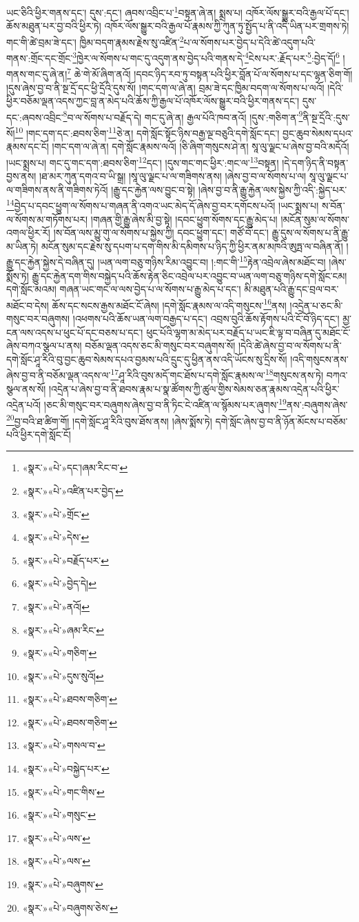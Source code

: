 ཡང་ཅིའི་ཕྱིར་གནས་དང་། དུས་:དང་། ཞབས་འབྲིང་པ་\footnote{«སྣར་»«པེ་»དང་།ཞམ་རིང་བ་}བསྟན་ཞེ་ན། སྨྲས་པ། འཁོར་ལོས་སྒྱུར་བའི་རྒྱལ་པོ་དང་། ཆོས་མཐུན་པར་བྱ་བའི་ཕྱིར་ཏེ། འཁོར་ལོས་སྒྱུར་བའི་རྒྱལ་པོ་རྣམས་ཀྱི་ཀུན་ཏུ་སྤྱོད་པ་ནི་འདི་ཡིན་པར་གྲགས་ཏེ། གང་གི་ཚེ་བྲམ་ཟེ་དང་། ཁྱིམ་བདག་རྣམས་རྗེས་སུ་འཛིན་\footnote{«སྣར་»«པེ་»འཛིན་པར་བྱེད་}པ་ལ་སོགས་པར་བྱེད་པ་དེའི་ཚེ་འདུག་པའི་གནས་:གྲོང་དང་གྲོང་\footnote{«སྣར་»«པེ་»གྲོང་}ཁྱེར་ལ་སོགས་པ་གང་དུ་འདུག་ནས་བྱེད་པའི་གནས་དེ་\footnote{«སྣར་»«པེ་»དེས་}ངེས་པར་:རྗོད་པར་\footnote{«སྣར་»«པེ་»བརྗོད་པར་}:བྱེད་དོ།\footnote{«སྣར་»«པེ་»བྱེད་དེ།} །གནས་གང་དུ་ཞེ་ན།\footnote{«སྣར་»«པེ་»ནའོ།} ཆེ་གེ་མོ་ཞིག་ནའོ། །དབང་ཉིད་རབ་ཏུ་བསྟན་པའི་ཕྱིར་བློན་པོ་ལ་སོགས་པ་དང་ལྷན་ཅིག་གོ། །དུས་ཞེས་བྱ་བ་ནི་སྔ་དྲོ་དང་ཕྱི་དྲོའི་དུས་སོ། །གང་དག་ལ་ཞེ་ན། བྲམ་ཟེ་དང་ཁྱིམ་བདག་ལ་སོགས་པ་ལའོ། །དེའི་ཕྱིར་བཅོམ་ལྡན་འདས་ཀྱང་བླ་ན་མེད་པའི་ཆོས་ཀྱི་རྒྱལ་པོ་འཁོར་ལོས་སྒྱུར་བའི་ཕྱིར་གནས་དང་། དུས་དང་:ཞབས་འབྲིང་\footnote{«སྣར་»«པེ་»ཞམ་རིང་}བ་ལ་སོགས་པ་བརྗོད་དེ། གང་དུ་ཞེ་ན། རྒྱལ་པོའི་ཁབ་ནའོ། །དུས་:གཅིག་ན་\footnote{«སྣར་»«པེ་»གཅིག་}ནི་སྔ་དྲོའི་:དུས་སོ།\footnote{«སྣར་»«པེ་»དུས་སུའོ།} །གང་དག་དང་:ཐབས་ཅིག་\footnote{«སྣར་»«པེ་»ཐབས་གཅིག་}ཅེ་ན། དགེ་སློང་སྟོང་ཉིས་བརྒྱ་ལྔ་བཅུའི་དགེ་སློང་དང་། བྱང་ཆུབ་སེམས་དཔའ་རྣམས་དང་ངོ། །གང་དག་ལ་ཞེ་ན། དགེ་སློང་རྣམས་ལའོ། །ཅི་ཞིག་གསུངས་ཤེ་ན། སཱ་ལུ་ལྗང་པ་ཞེས་བྱ་བའི་མདོའོ། །ཡང་སྨྲས་པ། གང་དུ་གང་དག་:ཐབས་ཅིག་\footnote{«སྣར་»«པེ་»ཐབས་གཅིག་}དང་། །དུས་གང་གང་ཕྱིར་:གང་ལ་\footnote{«སྣར་»«པེ་»གསལ་བ་}བསྟན། །དེ་དག་ཉིད་ནི་བསྟན་བྱས་ནས། །ཐ་མར་ཀུན་དགའ་བ་ཡི་སྒྲ། །སཱ་ལུ་ལྗང་པ་ལ་གཟིགས་ནས། །ཞེས་བྱ་བ་ལ་སོགས་པ་ལ། སཱ་ལུ་ལྗང་པ་ལ་གཟིགས་ནས་ནི་གཟིགས་ཏེའོ། །རྒྱུ་དང་རྐྱེན་ལས་བྱུང་བ་སྟེ། །ཞེས་བྱ་བ་ནི་རྒྱུ་རྐྱེན་ལས་སྐྱེས་ཀྱི་འདི་:སྐྱེད་པར་\footnote{«སྣར་»«པེ་»བསྐྱེད་པར་}བྱེད་པ་དབང་ཕྱུག་ལ་སོགས་པ་གཞན་ནི་འགའ་ཡང་མེད་དོ་ཞེས་བྱ་བར་དགོངས་པའོ། །ཡང་སྨྲས་པ། ས་བོན་ལ་སོགས་མ་གཏོགས་པར། །གཞན་གྱི་རྒྱུ་ཞེས་མི་བྱ་སྟེ། །དབང་ཕྱུག་སོགས་དང་རྒྱུ་མེད་པ། །མངོན་སུམ་ལ་སོགས་འགལ་ཕྱིར་རོ། །ས་བོན་ལས་མྱུ་གུ་ལ་སོགས་པ་སྐྱེས་ཀྱི། དབང་ཕྱུག་དང་། གཙོ་བོ་དང་། རྒྱུ་དུས་ལ་སོགས་པ་ནི་རྒྱུ་མ་ཡིན་ཏེ། མངོན་སུམ་དང་རྗེས་སུ་དཔག་པ་དག་གིས་མི་དམིགས་པ་ཉིད་ཀྱི་ཕྱིར་ནམ་མཁའི་ཨུཏྤ་ལ་བཞིན་ནོ། །རྒྱུ་དང་རྐྱེན་སྐྱེས་དེ་བཞིན་དུ། །ཡན་ལག་བཅུ་གཉིས་རིམ་འབྱུང་བ། །:གང་གི་\footnote{«སྣར་»«པེ་»གང་གིས་}རྟེན་འབྲེལ་ཞེས་མཐོང་བ། །ཞེས་སྨོས་ཏེ། རྒྱུ་དང་རྐྱེན་དག་གིས་བསྐྱེད་པའི་ཆོས་རྟེན་ཅིང་འབྲེལ་པར་འབྱུང་བ་ཡན་ལག་བཅུ་གཉིས་དགེ་སློང་ངམ། དགེ་སློང་མའམ། གཞན་ཡང་གང་ལ་ལས་བྱེད་པ་ལ་སོགས་པ་རྒྱུ་མེད་པ་དང་། མི་མཐུན་པའི་རྒྱུ་དང་བྲལ་བར་མཐོང་བ་དེས། ཆོས་དང་སངས་རྒྱས་མཐོང་ངོ་ཞེས། །དགེ་སློང་རྣམས་ལ་འདི་གསུངས་\footnote{«སྣར་»«པེ་»གསུང་}ནས། །འདྲེན་པ་ཅང་མི་གསུང་བར་བཞུགས། །འཕགས་པའི་ཆོས་ཡན་ལག་བརྒྱད་པ་དང་། འབྲས་བུའི་ཆོས་རྟོགས་པའི་ངོ་བོ་ཉིད་དང་། མྱ་ངན་ལས་འདས་པ་ཕུང་པོ་དང་བཅས་པ་དང་། ཕུང་པོའི་ལྷག་མ་མེད་པར་བརྗོད་པ་ཡང་ཇི་ལྟ་བ་བཞིན་དུ་མཐོང་ངོ་ཞེས་བཀའ་སྩལ་པ་ནས། བཅོམ་ལྡན་འདས་ཅང་མི་གསུང་བར་བཞུགས་སོ། །དེའི་ཚེ་ཞེས་བྱ་བ་ལ་སོགས་པ་ནི་དགེ་སློང་ཤཱ་རིའི་བུ་བྱང་ཆུབ་སེམས་དཔའ་བྱམས་པའི་དྲུང་དུ་ཕྱིན་ནས་འདི་ཡོངས་སུ་དྲིས་སོ། །འདི་གསུངས་ནས་ཞེས་བྱ་བ་ནི་བཅོམ་ལྡན་འདས་ལ་\footnote{«སྣར་»«པེ་»ལས་}ཤཱ་རིའི་བུས་མདོ་གང་ཐོས་པ་དགེ་སློང་རྣམས་ལ་\footnote{«སྣར་»«པེ་»ལས་}གསུངས་ནས་ཏེ། བཀའ་སྩལ་ནས་སོ། །འདྲེན་པ་ཞེས་བྱ་བ་ནི་ཐབས་རྣམ་པ་སྣ་ཚོགས་ཀྱི་ཚུལ་གྱིས་སེམས་ཅན་རྣམས་འདྲེན་པའི་ཕྱིར་འདྲེན་པའོ། །ཅང་མི་གསུང་བར་བཞུགས་ཞེས་བྱ་བ་ནི་ཏིང་ངེ་འཛིན་ལ་སྙོམས་པར་ཞུགས་\footnote{«སྣར་»«པེ་»བཞུགས་}ནས་:བཞུགས་ཞེས་\footnote{«སྣར་»«པེ་»བཞུགས་ཅེས་}བྱ་བའི་ཐ་ཚིག་གོ། །དགེ་སློང་ཤཱ་རིའི་བུས་ཐོས་ནས། །ཞེས་སྨོས་ཏེ། དགེ་སློང་ཞེས་བྱ་བ་ནི་ཉོན་མོངས་པ་བཅོམ་པའི་ཕྱིར་དགེ་སློང་ངོ། 